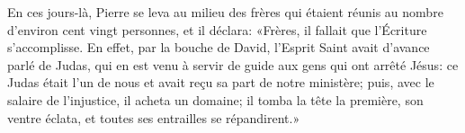 En ces jours-là, Pierre se leva au milieu des frères
	qui étaient réunis au nombre d’environ cent vingt personnes, et il déclara:
	«Frères, il fallait que l’Écriture s’accomplisse.
En effet, par la bouche de David, l’Esprit Saint avait d’avance parlé de Judas,
	qui en est venu à servir de guide aux gens qui ont arrêté Jésus:
	ce Judas était l’un de nous et avait reçu sa part de notre ministère;
	puis, avec le salaire de l’injustice, il acheta un domaine;
	il tomba la tête la première, son ventre éclata,
	et toutes ses entrailles se répandirent.»
